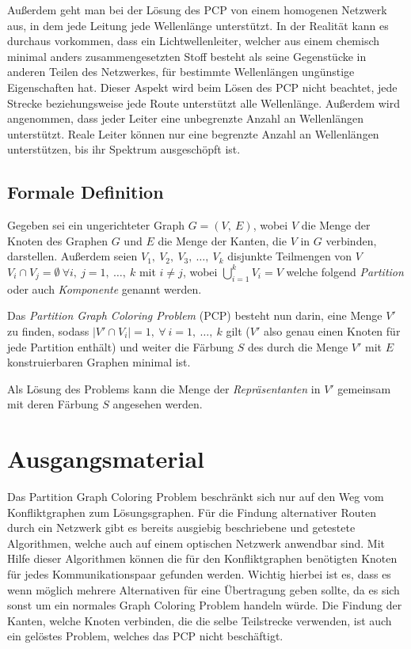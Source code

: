 Außerdem geht man bei der Lösung des PCP von einem homogenen Netzwerk aus, in dem jede Leitung jede Wellenlänge unterstützt. In der Realität kann es durchaus vorkommen, dass ein
Lichtwellenleiter, welcher aus einem chemisch minimal anders zusammengesetzten Stoff besteht als seine Gegenstücke in anderen Teilen des Netzwerkes, für bestimmte Wellenlängen
ungünstige Eigenschaften hat. Dieser Aspekt wird beim Lösen des PCP nicht beachtet, jede Strecke beziehungsweise jede Route unterstützt alle Wellenlänge. Außerdem wird angenommen, 
dass jeder Leiter eine unbegrenzte Anzahl an Wellenlängen unterstützt. Reale Leiter können nur eine begrenzte Anzahl an Wellenlängen unterstützen, bis ihr Spektrum ausgeschöpft ist.

\subsection{Formale Definition}

Gegeben sei ein ungerichteter Graph $G = (V,\ E)$, wobei $V$ die Menge der Knoten des Graphen $G$ und $E$ die Menge der Kanten, die $V$ in $G$ verbinden, darstellen. Außerdem seien $V_1,\ V_2,\ V_3,\ \ldots,\ V_k$ disjunkte Teilmengen von $V$ $V_i \cap V_j = \emptyset \ \forall i,\ j = 1,\ \ldots,\ k$ mit $i \not = j$, wobei $\bigcup_{i = 1}^k V_i = V$ welche folgend \textit{Partition} oder auch \textit{Komponente} genannt werden.

Das \textit{Partition Graph Coloring Problem} (PCP) besteht nun darin, eine Menge $V'$ zu finden, sodass $|V' \cap V_i| = 1,\ \forall\ i = 1,\ \ldots,\ k$ gilt ($V'$ also genau einen Knoten für jede Partition enthält) und weiter die Färbung $S$ des durch die Menge $V'$ mit $E$ konstruierbaren Graphen minimal ist.

Als Lösung des Problems kann die Menge der \textit{Repräsentanten} in $V'$ gemeinsam mit deren Färbung $S$ angesehen werden.

\section{Ausgangsmaterial}
Das Partition Graph Coloring Problem beschränkt sich nur auf den Weg vom Konfliktgraphen zum Lösungsgraphen. Für die Findung alternativer Routen durch ein Netzwerk gibt es 
bereits ausgiebig beschriebene und getestete Algorithmen, welche auch auf einem optischen Netzwerk anwendbar sind. Mit Hilfe dieser Algorithmen können die für den
Konfliktgraphen benötigten Knoten für jedes Kommunikationspaar gefunden werden. Wichtig hierbei ist es, dass es wenn möglich mehrere Alternativen für eine Übertragung geben sollte,
da es sich sonst um ein normales Graph Coloring Problem handeln würde. Die Findung der Kanten, welche Knoten verbinden, die die selbe Teilstrecke verwenden, ist auch ein
gelöstes Problem, welches das PCP nicht beschäftigt.

